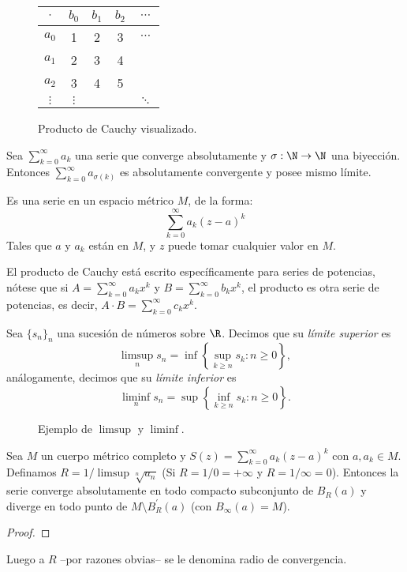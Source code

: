 \documentclass[11pt,oneside,a4paper]{book}
\begin{document}
\begin{figure}
\centering
\begin{tabular}{c|cccc}
$\cdot$ & $b_0$ & $b_1$ & $b_2$ & $\cdots$ \\ \hline
$a_0$ & 1 & 2 & 3 & $\cdots$ \\
$a_1$ & 2 & 3 & 4 \\
$a_2$ & 3 & 4 & 5 \\
$\vdots$ & $\vdots$ & & & $\ddots$
\end{tabular}
\caption{Producto de Cauchy visualizado.}
\end{figure}
\begin{thm}
Sea $\sum_{k=0}^\infty a_k$ una serie que converge absolutamente y $\sigma:\N\rightarrow\N$ una biyección. Entonces $\sum_{k=0}^\infty a_{\sigma(k)}$ es absolutamente convergente y posee mismo límite.
\end{thm}
\begin{mydef}
Es una serie en un espacio métrico $M$, de la forma:
$$\sum_{k=0}^\infty a_k(z-a)^k$$
Tales que $a$ y $a_k$ están en $M$, y $z$ puede tomar cualquier valor en $M$.
\end{mydef}
El producto de Cauchy está escrito específicamente para series de potencias, nótese que si $A=\sum_{k=0}^\infty a_kx^k$ y $B=\sum_{k=0}^\infty b_kx^k$, el producto es otra serie de potencias, es decir, $A\cdot B=\sum_{k=0}^\infty c_kx^k$.
\begin{mydef}
Sea $\{s_n\}_n$ una sucesión de números sobre $\R$. Decimos que su \textit{límite superior} es
$$\limsup_ns_n=\inf\left\{\sup_{k\geq n}s_k:n\geq 0\right\},$$
análogamente, decimos que su \textit{límite inferior} es
$$\liminf_ns_n=\sup\left\{\inf_{k\geq n}s_k:n\geq 0\right\}.$$
\end{mydef}
\begin{figure}
\centering
{}
\caption{Ejemplo de $\limsup$ y $\liminf$.}
\end{figure}
\begin{thm}
Sea $M$ un cuerpo métrico completo y $S(z)=\sum_{k=0}^\infty a_k(z-a)^k$ con $a,a_k\in M$. Definamos $R=1/\limsup\sqrt[n]{a_n}$ (Si $R=1/0=+\infty$ y $R=1/\infty=0$). Entonces la serie converge absolutamente en todo compacto subconjunto de $B_R(a)$ y diverge en todo punto de $M\setminus B^\prime_R(a)$ (con $B_\infty(a)=M$).
\end{thm}
\begin{proof}

\end{proof}
Luego a $R$ --por razones obvias-- se le denomina radio de convergencia.
\end{document}
